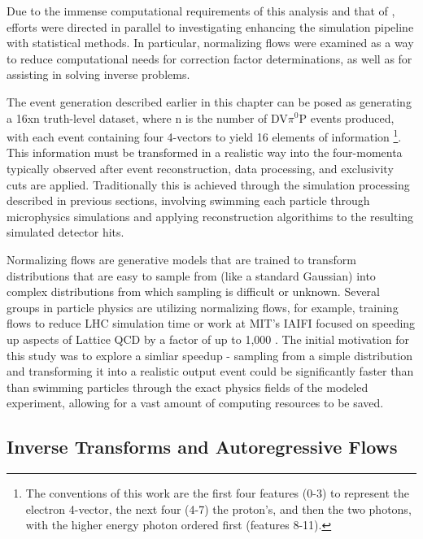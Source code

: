 Due to the immense computational requirements of this analysis and that of \parencite{Lee2022MeasurementDetector}, efforts were directed in parallel to investigating enhancing the simulation pipeline with statistical methods. In particular, normalizing flows were examined as a way to reduce computational needs for correction factor determinations, as well as for assisting in solving inverse problems. 

The event generation described earlier in this chapter can be posed as generating a 16xn truth-level dataset, where n is the number of DV$\pi^0$P events produced, with each event containing four 4-vectors to yield 16 elements of information \footnote{The conventions of this work are the first four features (0-3) to represent the electron 4-vector, the next four (4-7) the proton's, and then the two photons, with the higher energy photon ordered first (features 8-11). }. This information must be transformed in a realistic way into the four-momenta typically observed after event reconstruction, data processing, and exclusivity cuts are applied. Traditionally this is achieved through the simulation processing described in previous sections, involving swimming each particle through microphysics simulations and applying reconstruction algorithims to the resulting simulated detector hits. 

Normalizing flows are generative models that are trained to transform distributions that are easy to sample from (like a standard Gaussian) into complex distributions from which sampling is difficult or unknown. Several groups in particle physics are utilizing normalizing flows, for example, training flows to reduce LHC simulation time \parencite{Weisser2021ThePhysics} or work at MIT's IAIFI focused on speeding up aspects of Lattice QCD by a factor of up to 1,000 \parencite{Kanwar2020EquivariantTheory}. The initial motivation for this study was to explore a simliar speedup - sampling from a simple distribution and transforming it into a realistic output event could be significantly faster than than swimming particles through the exact physics fields of the modeled experiment, allowing for a vast amount of computing resources to be saved.  
    
\subsection{Inverse Transforms and Autoregressive Flows}
    
